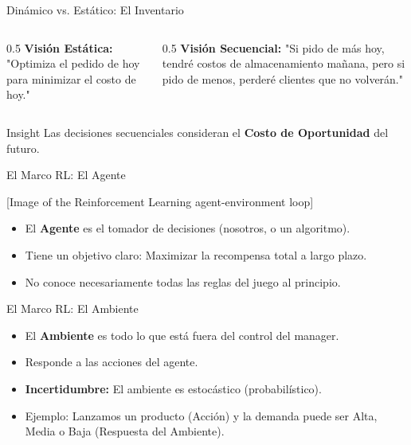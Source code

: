 \documentclass{beamer}
\begin{document}
\begin{frame}{Dinámico vs. Estático: El Inventario}
\begin{columns}
\begin{column}{0.5\textwidth}
\textbf{Visión Estática:}
"Optimiza el pedido de hoy para minimizar el costo de hoy."
\end{column}
\begin{column}{0.5\textwidth}
\textbf{Visión Secuencial:}
"Si pido de más hoy, tendré costos de almacenamiento mañana, pero si pido de menos, perderé clientes que no volverán."
\end{column}
\end{columns}
\vspace{0.5cm}
\begin{block}{Insight}
Las decisiones secuenciales consideran el \textbf{Costo de Oportunidad} del futuro.
\end{block}
\end{frame}

\begin{frame}{El Marco RL: El Agente}


[Image of the Reinforcement Learning agent-environment loop]

\begin{itemize}
    \item El \textbf{Agente} es el tomador de decisiones (nosotros, o un algoritmo).
    \item Tiene un objetivo claro: Maximizar la recompensa total a largo plazo.
    \item No conoce necesariamente todas las reglas del juego al principio.
\end{itemize}
\end{frame}

\begin{frame}{El Marco RL: El Ambiente}
\begin{itemize}
    \item El \textbf{Ambiente} es todo lo que está fuera del control del manager.
    \item Responde a las acciones del agente.
    \item \textbf{Incertidumbre:} El ambiente es estocástico (probabilístico). 
    \item Ejemplo: Lanzamos un producto (Acción) y la demanda puede ser Alta, Media o Baja (Respuesta del Ambiente).
\end{itemize}
\end{frame}
\end{document}
